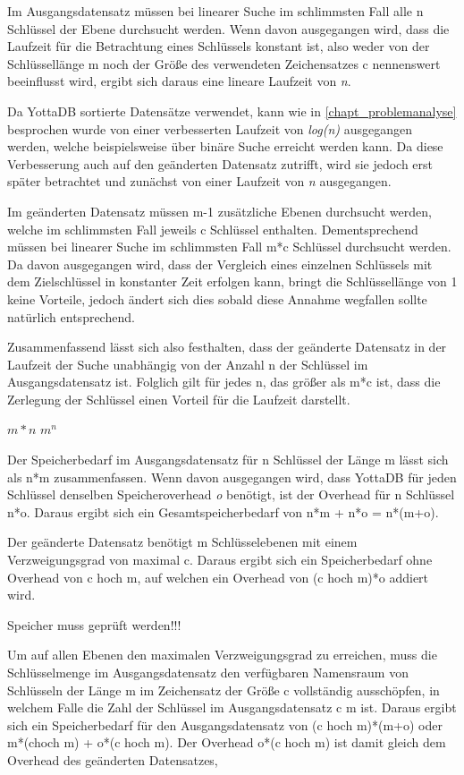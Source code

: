 \documentclass[oneside]{ausarbeitung}
\begin{document}
Im Ausgangsdatensatz müssen bei linearer Suche im schlimmsten Fall alle n Schlüssel der Ebene durchsucht werden. Wenn davon ausgegangen wird, dass die Laufzeit für die Betrachtung eines Schlüssels konstant ist, also weder von der Schlüssellänge m noch der Größe des verwendeten Zeichensatzes c nennenswert beeinflusst wird, ergibt sich daraus eine lineare Laufzeit von \textit{n}. 
	
Da YottaDB sortierte Datensätze verwendet, kann wie in \ref{chapt_problemanalyse} besprochen wurde von einer verbesserten Laufzeit von \textit{log(n)} ausgegangen werden, welche beispielsweise über binäre Suche erreicht werden kann. Da diese Verbesserung auch auf den geänderten Datensatz zutrifft, wird sie jedoch erst später betrachtet und zunächst von einer Laufzeit von \textit{n} ausgegangen.
	
Im geänderten Datensatz müssen m-1 zusätzliche Ebenen durchsucht werden, welche im schlimmsten Fall jeweils c Schlüssel enthalten. Dementsprechend müssen bei linearer Suche im schlimmsten Fall m*c Schlüssel durchsucht werden. Da davon ausgegangen wird, dass der Vergleich eines einzelnen Schlüssels mit dem Zielschlüssel in konstanter Zeit erfolgen kann, bringt die Schlüssellänge von 1 keine Vorteile, jedoch ändert sich dies sobald diese Annahme wegfallen sollte natürlich entsprechend.
	
Zusammenfassend lässt sich also festhalten, dass der geänderte Datensatz in der Laufzeit der Suche unabhängig von der Anzahl n der Schlüssel im Ausgangsdatensatz ist. Folglich gilt für jedes n, das größer als m*c ist, dass die Zerlegung der Schlüssel einen Vorteil für die Laufzeit darstellt. 
	

\(m*n\)
\(m^n\)


	
Der Speicherbedarf im Ausgangsdatensatz für n Schlüssel der Länge m lässt sich als n*m zusammenfassen. Wenn davon ausgegangen wird, dass YottaDB für jeden Schlüssel denselben Speicheroverhead \textit{o} benötigt, ist der Overhead für n Schlüssel n*o. Daraus ergibt sich ein Gesamtspeicherbedarf von n*m + n*o = n*(m+o).
	
Der geänderte Datensatz benötigt m Schlüsselebenen mit einem Verzweigungsgrad von maximal c. Daraus ergibt sich ein Speicherbedarf ohne Overhead von c hoch m, auf welchen ein Overhead von (c hoch m)*o addiert wird. 
	
	
Speicher muss geprüft werden!!!
	
	
	
Um auf allen Ebenen den maximalen Verzweigungsgrad zu erreichen, muss die Schlüsselmenge im Ausgangsdatensatz den verfügbaren Namensraum von Schlüsseln der Länge m im Zeichensatz der Größe c vollständig ausschöpfen, in welchem Falle die Zahl der Schlüssel im Ausgangsdatensatz c m ist. Daraus ergibt sich ein Speicherbedarf für den Ausgangsdatensatz von (c hoch m)*(m+o) oder m*(choch m) + o*(c hoch m). Der Overhead o*(c hoch m) ist damit gleich dem Overhead des geänderten Datensatzes, 
	
\end{document}
